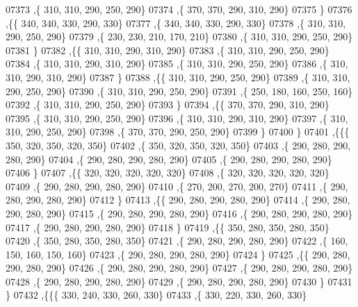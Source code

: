 \begin{DoxyCode}
07373     ,\{   310,   310,   290,   250,   290\}
07374     ,\{   370,   370,   290,   310,   290\}
07375     \}
07376    ,\{\{   340,   340,   330,   290,   330\}
07377     ,\{   340,   340,   330,   290,   330\}
07378     ,\{   310,   310,   290,   250,   290\}
07379     ,\{   230,   230,   210,   170,   210\}
07380     ,\{   310,   310,   290,   250,   290\}
07381     \}
07382    ,\{\{   310,   310,   290,   310,   290\}
07383     ,\{   310,   310,   290,   250,   290\}
07384     ,\{   310,   310,   290,   310,   290\}
07385     ,\{   310,   310,   290,   250,   290\}
07386     ,\{   310,   310,   290,   310,   290\}
07387     \}
07388    ,\{\{   310,   310,   290,   250,   290\}
07389     ,\{   310,   310,   290,   250,   290\}
07390     ,\{   310,   310,   290,   250,   290\}
07391     ,\{   250,   180,   160,   250,   160\}
07392     ,\{   310,   310,   290,   250,   290\}
07393     \}
07394    ,\{\{   370,   370,   290,   310,   290\}
07395     ,\{   310,   310,   290,   250,   290\}
07396     ,\{   310,   310,   290,   310,   290\}
07397     ,\{   310,   310,   290,   250,   290\}
07398     ,\{   370,   370,   290,   250,   290\}
07399     \}
07400    \}
07401   ,\{\{\{   350,   320,   350,   320,   350\}
07402     ,\{   350,   320,   350,   320,   350\}
07403     ,\{   290,   280,   290,   280,   290\}
07404     ,\{   290,   280,   290,   280,   290\}
07405     ,\{   290,   280,   290,   280,   290\}
07406     \}
07407    ,\{\{   320,   320,   320,   320,   320\}
07408     ,\{   320,   320,   320,   320,   320\}
07409     ,\{   290,   280,   290,   280,   290\}
07410     ,\{   270,   200,   270,   200,   270\}
07411     ,\{   290,   280,   290,   280,   290\}
07412     \}
07413    ,\{\{   290,   280,   290,   280,   290\}
07414     ,\{   290,   280,   290,   280,   290\}
07415     ,\{   290,   280,   290,   280,   290\}
07416     ,\{   290,   280,   290,   280,   290\}
07417     ,\{   290,   280,   290,   280,   290\}
07418     \}
07419    ,\{\{   350,   280,   350,   280,   350\}
07420     ,\{   350,   280,   350,   280,   350\}
07421     ,\{   290,   280,   290,   280,   290\}
07422     ,\{   160,   150,   160,   150,   160\}
07423     ,\{   290,   280,   290,   280,   290\}
07424     \}
07425    ,\{\{   290,   280,   290,   280,   290\}
07426     ,\{   290,   280,   290,   280,   290\}
07427     ,\{   290,   280,   290,   280,   290\}
07428     ,\{   290,   280,   290,   280,   290\}
07429     ,\{   290,   280,   290,   280,   290\}
07430     \}
07431    \}
07432   ,\{\{\{   330,   240,   330,   260,   330\}
07433     ,\{   330,   220,   330,   260,   330\}

\end{DoxyCode}
